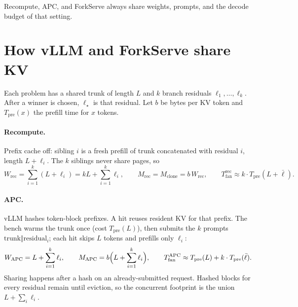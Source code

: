 \documentclass[11pt,a4paper]{article}
\begin{document}
Recompute, APC, and ForkServe always share weights, prompts, and the decode budget of that setting.

\section{How vLLM and ForkServe share KV}

Each problem has a shared trunk of length $L$ and $k$ branch residuals $\ell_1,\ldots,\ell_k$.
After a winner is chosen, $\ell_{\star}$ is that residual.
Let $b$ be bytes per KV token and $T_{\mathrm{pre}}(x)$ the prefill time for $x$ tokens.

\paragraph{Recompute.}
Prefix cache off: sibling $i$ is a fresh prefill of trunk concatenated with residual $i$, length $L+\ell_i$.
The $k$ siblings never share pages, so
\begin{equation}
\label{eq:rec}
W_{\mathrm{rec}}
  =\sum_{i=1}^{k}(L+\ell_i)
  =kL+\sum_{i=1}^{k}\ell_i,
\qquad
M_{\mathrm{rec}}
  = M_{\mathrm{clone}}
  = b\,W_{\mathrm{rec}},
\qquad
T_{\mathrm{fan}}^{\mathrm{rec}}
  \approx k\cdot T_{\mathrm{pre}}(L+\bar\ell).
\end{equation}

\paragraph{APC.}
vLLM hashes token-block prefixes.
A hit reuses resident KV for that prefix.
The bench warms the trunk once (cost $T_{\mathrm{pre}}(L)$), then submits the $k$ prompts $\mathrm{trunk}\Vert\mathrm{residual}_i$; each hit skips $L$ tokens and prefills only $\ell_i$:
\begin{equation}
\label{eq:apc}
W_{\mathrm{APC}}
  =L+\sum_{i=1}^{k}\ell_i,
\qquad
M_{\mathrm{APC}}
  = b\Bigl(L+\sum_{i=1}^{k}\ell_i\Bigr),
\qquad
T_{\mathrm{fan}}^{\mathrm{APC}}
  \approx T_{\mathrm{pre}}(L)+k\cdot T_{\mathrm{pre}}(\bar\ell).
\end{equation}
Sharing happens after a hash on an already-submitted request.
Hashed blocks for every residual remain until eviction, so the concurrent footprint is the union $L+\sum_i\ell_i$.
\end{document}
